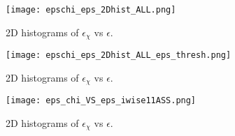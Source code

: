 \documentclass[11pt]{article}
\begin{document}
\begin{figure}[htbp]
\texttt{[image: epschi\_eps\_2Dhist\_ALL.png]}
\caption{2D histograms of $\epsilon_{\chi}$ vs $\epsilon$.}
\label{}
\end{figure}


\begin{figure}[htbp]
\texttt{[image: epschi\_eps\_2Dhist\_ALL\_eps\_thresh.png]}
\caption{2D histograms of $\epsilon_{\chi}$ vs $\epsilon$.}
\label{}
\end{figure}


\begin{figure}[htbp]
\texttt{[image: eps\_chi\_VS\_eps\_iwise11ASS.png]}
\caption{2D histograms of $\epsilon_{\chi}$ vs $\epsilon$.}
\label{}
\end{figure}
\end{document}
